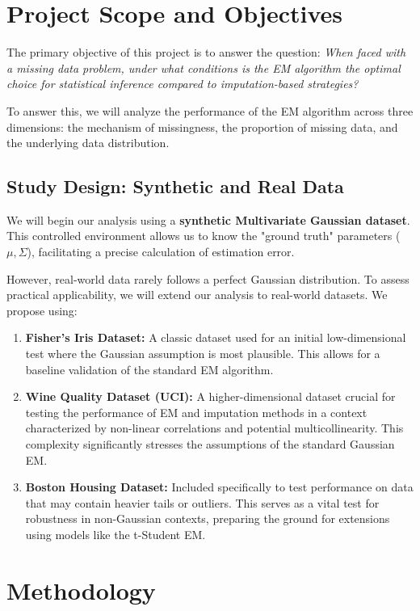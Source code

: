 \documentclass{article}
\begin{document}
\section{Project Scope and Objectives}

The primary objective of this project is to answer the question: \textit{When faced with a missing data problem, under what conditions is the EM algorithm the optimal choice for statistical inference compared to imputation-based strategies?}

To answer this, we will analyze the performance of the EM algorithm across three dimensions: the mechanism of missingness, the proportion of missing data, and the underlying data distribution.

\subsection{Study Design: Synthetic and Real Data}
We will begin our analysis using a \textbf{synthetic Multivariate Gaussian dataset}. This controlled environment allows us to know the "ground truth" parameters ($\mu, \Sigma$), facilitating a precise calculation of estimation error.

However, real-world data rarely follows a perfect Gaussian distribution. To assess practical applicability, we will extend our analysis to real-world datasets. We propose using:

\begin{enumerate}
    \item \textbf{Fisher's Iris Dataset:} A classic dataset used for an initial low-dimensional test where the Gaussian assumption is most plausible. This allows for a baseline validation of the standard EM algorithm.
    \item \textbf{Wine Quality Dataset (UCI):}  A higher-dimensional dataset crucial for testing the performance of EM and imputation methods in a context characterized by non-linear correlations and potential multicollinearity. This complexity significantly stresses the assumptions of the standard Gaussian EM.
    \item \textbf{Boston Housing Dataset:} Included specifically to test performance on data that may contain heavier tails or outliers. This serves as a vital test for robustness in non-Gaussian contexts, preparing the ground for extensions using models like the t-Student EM.
\end{enumerate}

\section{Methodology}
\end{document}
